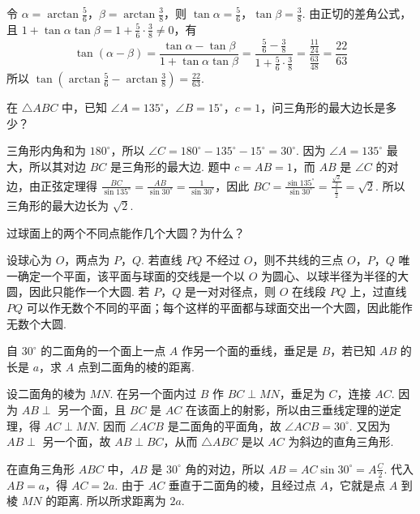 \begin{solution}
令 \(\alpha=\arctan\frac{5}{6}\)，\(\beta=\arctan\frac{3}{8}\)，则 \(\tan\alpha=\frac{5}{6}\)，\(\tan\beta=\frac{3}{8}\). 由正切的差角公式，且 \(1+\tan\alpha\tan\beta=1+\frac{5}{6}\cdot\frac{3}{8}\neq 0\)，有
\[
\tan\left(\alpha-\beta\right)=\frac{\tan\alpha-\tan\beta}{1+\tan\alpha\tan\beta}=\frac{\frac{5}{6}-\frac{3}{8}}{1+\frac{5}{6}\cdot\frac{3}{8}}=\frac{\frac{11}{24}}{\frac{63}{48}}=\frac{22}{63}
\]
所以 \(\tan\left( \arctan \frac{5}{6}-\arctan \frac{3}{8} \right)=\frac{22}{63}\).
\end{solution}

\begin{problem}
在 \(\triangle ABC\) 中，已知 \(\angle A=135^\circ\)，\(\angle B=15^\circ\)，\(c=1\)，问三角形的最大边长是多少？
\end{problem}

\begin{solution}
三角形内角和为 \(180^\circ\)，所以 \(\angle C=180^\circ-135^\circ-15^\circ=30^\circ\). 因为 \(\angle A=135^\circ\) 最大，所以其对边 \(BC\) 是三角形的最大边. 题中 \(c=AB=1\)，而 \(AB\) 是 \(\angle C\) 的对边，由正弦定理得 \(\frac{BC}{\sin135^\circ}=\frac{AB}{\sin30^\circ}=\frac{1}{\sin30^\circ}\)，因此 \(BC=\frac{\sin135^\circ}{\sin30^\circ}=\frac{\frac{\sqrt{2}}{2}}{\frac{1}{2}}=\sqrt{2}\). 所以三角形的最大边长为 \(\sqrt{2}\).
\end{solution}

\begin{problem}
过球面上的两个不同点能作几个大圆？为什么？
\end{problem}

\begin{solution}
设球心为 \(O\)，两点为 \(P\)，\(Q\). 若直线 \(PQ\) 不经过 \(O\)，则不共线的三点 \(O\)，\(P\)，\(Q\) 唯一确定一个平面，该平面与球面的交线是一个以 \(O\) 为圆心、以球半径为半径的大圆，因此只能作一个大圆. 若 \(P\)，\(Q\) 是一对对径点，则 \(O\) 在线段 \(PQ\) 上，过直线 \(PQ\) 可以作无数个不同的平面；每个这样的平面都与球面交出一个大圆，因此能作无数个大圆.
\end{solution}

\begin{problem}
自 \(30^\circ\) 的二面角的一个面上一点 \(A\) 作另一个面的垂线，垂足是 \(B\)，若已知 \(AB\) 的长是 \(a\)，求 \(A\) 点到二面角的棱的距离.
\end{problem}

\begin{solution}
设二面角的棱为 \(MN\). 在另一个面内过 \(B\) 作 \(BC\perp MN\)，垂足为 \(C\)，连接 \(AC\). 因为 \(AB\perp\) 另一个面，且 \(BC\) 是 \(AC\) 在该面上的射影，所以由三垂线定理的逆定理，得 \(AC\perp MN\). 因而 \(\angle ACB\) 是二面角的平面角，故 \(\angle ACB=30^\circ\). 又因为 \(AB\perp\) 另一个面，故 \(AB\perp BC\)，从而 \(\triangle ABC\) 是以 \(AC\) 为斜边的直角三角形.


在直角三角形 \(ABC\) 中，\(AB\) 是 \(30^\circ\) 角的对边，所以 \(AB=AC\sin30^\circ=A\frac{C}{2}\). 代入 \(AB=a\)，得 \(AC=2a\). 由于 \(AC\) 垂直于二面角的棱，且经过点 \(A\)，它就是点 \(A\) 到棱 \(MN\) 的距离. 所以所求距离为 \(2a\).
\end{solution}

